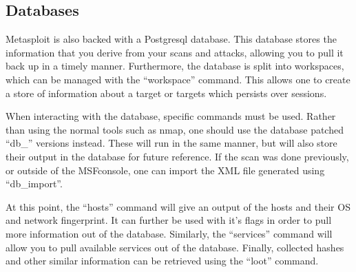 			\subsection{Databases}
				Metasploit is also backed with a Postgresql database. 
				This database stores the information that you derive from your scans and attacks, allowing you to pull it back up in a timely manner. 
				Furthermore, the database is split into workspaces, which can be managed with the ``workspace'' command. 
				This allows one to create a store of information about a target or targets which persists over sessions. 

				When interacting with the database, specific commands must be used. 
				Rather than using the normal tools such as nmap, one should use the database patched ``db\_'' versions instead. 
				These will run in the same manner, but will also store their output in the database for future reference. 
				If the scan was done previously, or outside of the MSFconsole, one can import the XML file generated using ``db\_import''. 

				At this point, the ``hosts'' command will give an output of the hosts and their OS and network fingerprint. 
				It can further be used with it's flags in order to pull more information out of the database. 
				Similarly, the ``services'' command will allow you to pull available services out of the database. 
				Finally, collected hashes and other similar information can be retrieved using the ``loot'' command. 
	
